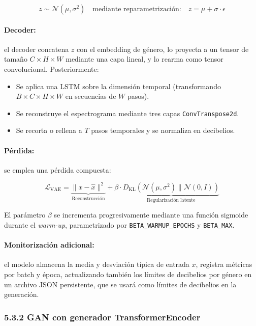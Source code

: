 \[
z \sim \mathcal{N}(\mu, \sigma^2) \quad \text{mediante reparametrización:} \quad z = \mu + \sigma \cdot \epsilon
\]

\paragraph{Decoder:} el decoder concatena $z$ con el embedding de género, lo proyecta a un tensor de tamaño $C \times H \times W$ mediante una capa lineal, y lo rearma como tensor convolucional. Posteriormente:

\begin{itemize}
    \item Se aplica una LSTM sobre la dimensión temporal (transformando $B \times C \times H \times W$ en secuencias de $W$ pasos).
    \item Se reconstruye el espectrograma mediante tres capas \texttt{ConvTranspose2d}.
    \item Se recorta o rellena a $T$ pasos temporales y se normaliza en decibelios.
\end{itemize}

\paragraph{Pérdida:} se emplea una pérdida compuesta:

\[
\mathcal{L}_{\text{VAE}} = \underbrace{\|x - \hat{x}\|^2}_{\text{Reconstrucción}} + \beta \cdot \underbrace{D_{\text{KL}}(\mathcal{N}(\mu, \sigma^2) \parallel \mathcal{N}(0, I))}_{\text{Regularización latente}}
\]

El parámetro $\beta$ se incrementa progresivamente mediante una función sigmoide durante el \textit{warm-up}, parametrizado por \texttt{BETA\_WARMUP\_EPOCHS} y \texttt{BETA\_MAX}.

\paragraph{Monitorización adicional:} el modelo almacena la media y desviación típica de entrada $x$, registra métricas por batch y época, actualizando también los límites de decibelios por género en un archivo JSON persistente, que se usará como límites de decibelios en la generación.

\vspace{1em}

\subsubsection*{5.3.2 GAN con generador TransformerEncoder}

